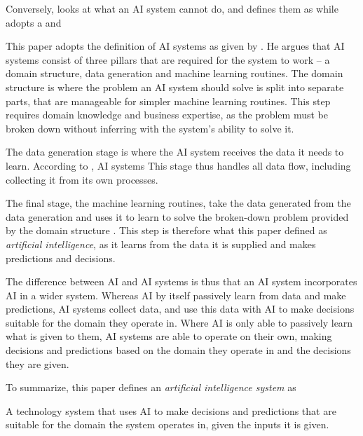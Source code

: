 Conversely, \textcite[p.~8]{Merhi_2022} looks at what an AI system cannot do, and defines them as  while \textcite[p.~2]{vanBruxvoort_2021} adopts a  and 

This paper adopts the definition of AI systems as given by \textcite{Taddy_2018_AIsystem}. He argues that AI systems consist of three pillars that are required for the system to work -- a domain structure, data generation and machine learning routines. The domain structure is where the problem an AI system should solve is split into separate parts, that are manageable for simpler machine learning routines. This step requires domain knowledge and business expertise, as the problem must be broken down without inferring with the system's ability to solve it.

The data generation stage is where the AI system receives the data it needs to learn. According to \textcite[p.~4]{Taddy_2018_AIsystem}, AI systems  This stage thus handles all data flow, including collecting it from its own processes.

The final stage, the machine learning routines, take the data generated from the data generation and uses it to learn to solve the broken-down problem provided by the domain structure \parencite{Taddy_2018_AIsystem}. This step is therefore what this paper defined as \textit{artificial intelligence}, as it learns from the data it is supplied and makes predictions and decisions.

The difference between AI and AI systems is thus that an AI system incorporates AI in a wider system. Whereas AI by itself passively learn from data and make predictions, AI systems collect data, and use this data with AI to make decisions suitable for the domain they operate in. Where AI is only able to passively learn what is given to them, AI systems are able to operate on their own, making decisions and predictions based on the domain they operate in and the decisions they are given.

To summarize, this paper defines an \textit{artificial intelligence system} as 
\begin{displayquote}
    A technology system that uses AI to make decisions and predictions that are suitable for the domain the system operates in, given the inputs it is given.
\end{displayquote}


